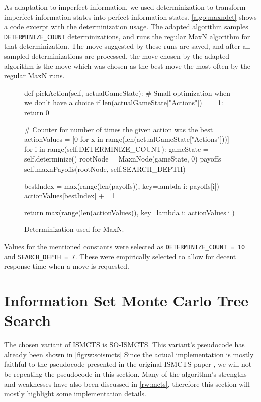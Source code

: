 As adaptation to imperfect information, we used determinization to transform
imperfect information states into perfect information states.
\autoref{algo:maxndet} shows a code excerpt with the determinization usage.
The adapted algorithm samples \texttt{DETERMINIZE\_COUNT} determinizations,
and runs the regular MaxN algorithm for that determinization. The move suggested
by these runs are saved, and after all sampled determinizations are processed,
the move chosen by the adapted algorithm is the move which was chosen as the best
move the most often by the regular MaxN runs.

\begin{figure}[h!]
\begin{code}[commandchars=\\\{\},codes={\catcode`\$=3\catcode`\^=7\catcode`\_=8}]
def pickAction(self, actualGameState):
    \# Small optimization when we don't have a choice
    if len(actualGameState["Actions"]) == 1:
        return 0

    \# Counter for number of times the given action was the best
    actionValues = [0 for x in range(len(actualGameState["Actions"]))]
    for i in range(self.DETERMINIZE\_COUNT):
        gameState = self.determinize()
        rootNode = MaxnNode(gameState, 0)
        payoffs = self.maxnPayoffs(rootNode, self.SEARCH\_DEPTH)
        
        bestIndex = max(range(len(payoffs)), key=lambda i: payoffs[i])
        actionValues[bestIndex] += 1

    return max(range(len(actionValues)), key=lambda i: actionValues[i])
\end{code}
\caption{Determinization used for MaxN.}\label{algo:maxndet}
\end{figure}

Values for the mentioned constants were selected as \texttt{DETERMINIZE\_COUNT = 10}
and \texttt{SEARCH\_DEPTH = 7}. These were empirically selected to allow for decent
response time when a move is requested.

\section{Information Set Monte Carlo Tree Search}

The chosen variant of ISMCTS is SO-ISMCTS. This variant's pseudocode
has already been shown in \autoref{figrw:soismcts} Since the actual
implementation is mostly faithful to the pseudocode presented in the original
ISMCTS paper \cite{Cowling12}, we will not be repeating the pseudocode in this section.
Many of the algorithm's strengths and weaknesses have also been discussed in
\autoref{rw:mcts}, therefore this section will mostly highlight some implementation
details.

